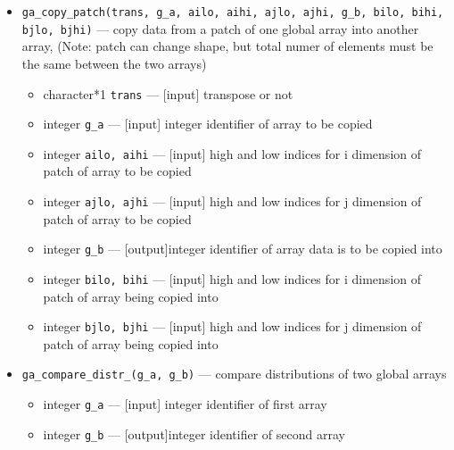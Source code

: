 \begin{itemize}
\item {\tt ga\_copy\_patch(trans, g\_a, ailo, aihi, ajlo, ajhi, g\_b, bilo,
bihi, bjlo, bjhi)} --- copy data from a patch of one global
  array into another array, (Note: patch can change shape, but total numer of elements
  must be the same between the two arrays)
\begin{itemize}
\item      character*1 {\tt trans}      --- [input] transpose or not
\item      integer {\tt g\_a}           --- [input] integer identifier of array to be copied
\item     integer {\tt ailo, aihi}      --- [input] high and low indices for i dimension of
                                               patch of array 
                                               to be copied
\item     integer {\tt ajlo, ajhi}      --- [input] high and low indices for j dimension of
                                               patch of array 
                                               to be copied
\item      integer {\tt g\_b}           --- [output]integer identifier of array data is to be
                                       copied into
\item     integer {\tt bilo, bihi}      --- [input] high and low indices for i dimension of patch
                                               of array being copied into
\item     integer {\tt bjlo, bjhi}      --- [input] high and low indices for j dimension of patch
                                               of array being copied into
\end{itemize}

\item {\tt ga\_compare\_distr\_(g\_a, g\_b)} --- compare distributions of two global
  arrays
\begin{itemize}
\item      integer {\tt g\_a}           --- [input] integer identifier of first array
\item      integer {\tt g\_b}           --- [output]integer identifier of second array
\end{itemize}

\end{itemize}


